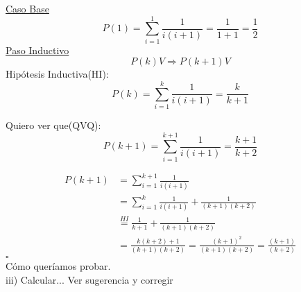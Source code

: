 \documentclass[a4paper,11pt]{article}
\begin{document}
\underline{Caso Base}\\
\[ P(1) = \sum_{i=1}^{1} \frac{1}{i(i+1)} = \frac{1}{1+1} = \frac{1}{2} \]
\underline{Paso Inductivo}\\
\[P(k) V \Rightarrow P(k+1) V\]
Hipótesis Inductiva(HI):\[ P(k) = \sum_{i=1}^{k} \frac{1}{i(i+1)} = \frac{k}{k+1} \]

Quiero ver que(QVQ):\[ P(k+1) = \sum_{i=1}^{k+1} \frac{1}{i(i+1)} = \frac{k+1}{k+2} \]



\begin{equation}
\begin{split}
P(k+1) & = \sum_{i=1}^{k+1} \frac{1}{i(i+1)}  \\
 & = \sum_{i=1}^{k} \frac{1}{i(i+1)} + \frac{1}{(k+1)(k+2)} \\
 & \stackrel{HI}{=} \frac{1}{k+1} + \frac{1}{(k+1)(k+2)} \\
 & = \frac{k(k+2)+1}{(k+1)(k+2)} = \frac{(k+1)^2}{(k+1)(k+2)} = \frac{(k+1)}{(k+2)} 
\end{split}
\end{equation}
\hfill$\square $\\
Cómo queríamos probar.\\
iii) Calcular... Ver sugerencia y corregir 
\end{document}
